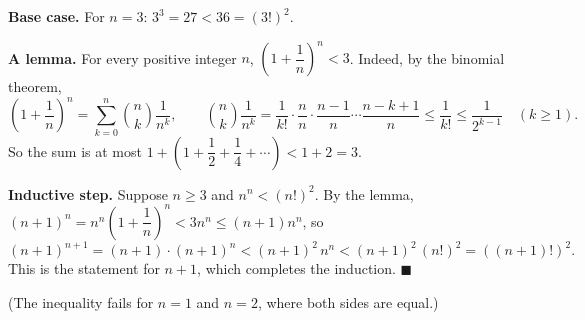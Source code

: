\textbf{Base case.} For $n=3$: $3^3=27<36=(3!)^2$.

\textbf{A lemma.} For every positive integer $n$, $\left(1+\dfrac1n\right)^n<3$. Indeed, by the binomial theorem,
\[\left(1+\dfrac1n\right)^n=\sum_{k=0}^{n}\binom nk\dfrac1{n^k},\qquad\binom nk\dfrac1{n^k}=\dfrac{1}{k!}\cdot\dfrac{n}{n}\cdot\dfrac{n-1}{n}\cdots\dfrac{n-k+1}{n}\le\dfrac1{k!}\le\dfrac1{2^{k-1}}\quad(k\ge1).\]
So the sum is at most $1+\left(1+\dfrac12+\dfrac14+\cdots\right)<1+2=3$.

\textbf{Inductive step.} Suppose $n\ge3$ and $n^n<(n!)^2$. By the lemma, $(n+1)^n=n^n\left(1+\dfrac1n\right)^n<3n^n\le(n+1)n^n$, so
\[(n+1)^{n+1}=(n+1)\cdot(n+1)^n<(n+1)^2\,n^n<(n+1)^2\,(n!)^2=\left((n+1)!\right)^2.\]
This is the statement for $n+1$, which completes the induction. $\blacksquare$

(The inequality fails for $n=1$ and $n=2$, where both sides are equal.)
